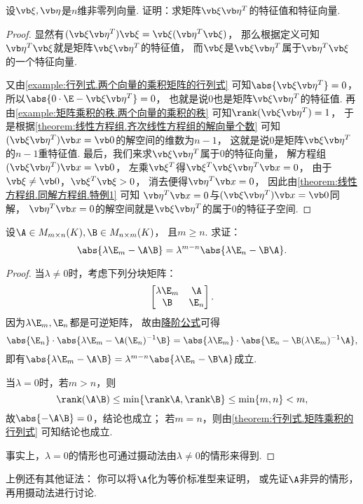 \begin{example}\label{example:矩阵乘积的秩.两个向量的乘积的特征值和特征向量}
设\(\a,\b\)是\(n\)维非零列向量.
证明：求矩阵\(\a\b^T\)的特征值和特征向量.
\begin{proof}
显然有\((\a\b^T)\a = \a(\b^T\a)\)，
那么根据定义可知\(\b^T\a\)就是矩阵\(\a\b^T\)的特征值，
而\(\a\)是\(\a\b^T\)属于\(\b^T\a\)的一个特征向量.

又由\cref{example:行列式.两个向量的乘积矩阵的行列式} 可知\(\abs{\a\b^T} = 0\)，
所以\(\abs{0\cdot\E-\a\b^T}=0\)，
也就是说\(0\)也是矩阵\(\a\b^T\)的特征值.
再由\cref{example:矩阵乘积的秩.两个向量的乘积的秩} 可知\(\rank(\a\b^T) = 1\)，
于是根据\cref{theorem:线性方程组.齐次线性方程组的解向量个数} 可知
\((\a\b^T)\x=\vb0\)的解空间的维数为\(n-1\)，
这就是说\(0\)是矩阵\(\a\b^T\)的\(n-1\)重特征值.
最后，我们来求\(\a\b^T\)属于\(0\)的特征向量，
解方程组\((\a\b^T)\x=\vb0\)，
左乘\(\a^T\)得\(\a^T\a\b^T\x=0\)，
由于\(\a\neq\vb0\)，\(\a^T\a>0\)，
消去便得\(\b^T\x=0\)，
因此由\cref{theorem:线性方程组.同解方程组.特例1} 可知
\(\b^T\x=0\)与\((\a\b^T)\x=\vb0\)同解，
\(\b^T\x=0\)的解空间就是\(\a\b^T\)的属于\(0\)的特征子空间.
\end{proof}
\end{example}

\begin{example}
设\(\A \in M_{m \times n}(K),
\B \in M_{n \times m}(K)\)，
且\(m \geq n\).
求证：\begin{equation}
	\abs{\lambda\E_m-\A\B} = \lambda^{m-n} \abs{\lambda\E_n-\B\A}.
\end{equation}
\begin{proof}
当\(\lambda\neq0\)时，考虑下列分块矩阵：\[
	\begin{bmatrix}
		\lambda\E_m & \A \\
		\B & \E_n
	\end{bmatrix}.
\]
因为\(\lambda\E_m,\E_n\)都是可逆矩阵，
故由\hyperref[theorem:逆矩阵.行列式降阶定理]{降阶公式}可得\[
	\abs{\E_n} \cdot \abs{\lambda\E_m - \A (\E_n)^{-1} \B}
	= \abs{\lambda\E_m} \cdot \abs{\E_n - \B (\lambda\E_m)^{-1} \A},
\]
即有\(\abs{\lambda\E_m-\A\B} = \lambda^{m-n} \abs{\lambda\E_n-\B\A}\)成立.

当\(\lambda=0\)时，若\(m>n\)，则\[
	\rank(\A\B) \leq \min\{\rank\A,\rank\B\} \leq \min\{m,n\} < m,
\]
故\(\abs{-\A\B}=0\)，结论也成立；
若\(m = n\)，则由\cref{theorem:行列式.矩阵乘积的行列式} 可知结论也成立.

事实上，\(\lambda=0\)的情形也可通过摄动法由\(\lambda\neq0\)的情形来得到.
\end{proof}
\end{example}
上例还有其他证法：
你可以将\(\A\)化为等价标准型来证明，
或先证\(\A\)非异的情形，再用摄动法进行讨论.

